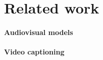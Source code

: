 \section{Related work}
\label{sec:related}



\paragraph{Audiovisual models}
\citet{aytar2016soundnet,owens2016visually,owens2016ambient}
\paragraph{Video captioning}
\citet{krishna2017dense,zhou2018end}
